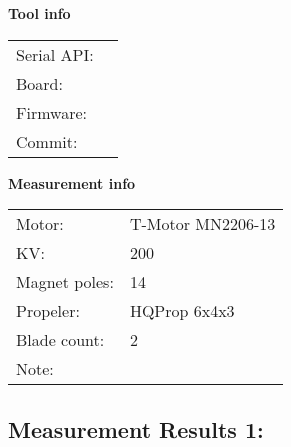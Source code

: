 \documentclass[10pt]{article}
\begin{document}
\noindent
{\large \bf Tool info}
\vspace{3mm}

\noindent
\begin{tabular}{ll}
Serial API:  & \\ 
Board:       & \\ 
Firmware:    & \\ 
Commit:      & 
\end{tabular}
\vspace{3mm}

\noindent
{\large \bf Measurement info}
\vspace{3mm}

\noindent
\begin{tabular}{ll}
Motor:        & T-Motor MN2206-13\\ 
KV:           & 200\\ 
Magnet poles: & 14\\ 
Propeler:     & HQProp 6x4x3\\ 
Blade count:  & 2\\ 
Note:         & 
\end{tabular}

\vspace{3mm}


\subsection*{\large \bf Measurement Results 1:}
\end{document}
